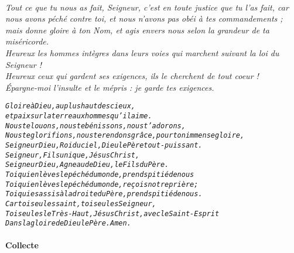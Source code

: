 \documentclass[twoside]{article}
\begin{document}

\\
\emph{\rr Tout ce que tu nous as fait, Seigneur, c'est en toute justice que tu l'as fait, car nous avons péché contre toi, et nous n'avons pas obéi à tes commandements ; mais donne gloire à ton Nom, et agis envers nous selon la grandeur de ta miséricorde.\\
\vv {} Heureux les hommes intègres dans leurs voies qui marchent suivant la loi du Seigneur !\\
\vv {} Heureux ceux qui gardent ses exigences, ils le cherchent de tout coeur !\\
\vv {} Épargne-moi l'insulte et le mépris : je garde tes exigences.}



\begin{alltt}\normalfont
\emph{Gloire à Dieu, au plus haut des cieux, 
et paix sur la terre aux hommes qu’il aime.
Nous te louons, nous te bénissons, nous t’adorons,
Nous te glorifions, nous te rendons grâce, pour ton immense gloire,
Seigneur Dieu, Roi du ciel, Dieu le Père tout-puissant.
Seigneur, Fils unique, Jésus Christ,
Seigneur Dieu, Agneau de Dieu, le Fils du Père.
Toi qui enlèves le péché du monde, prends pitié de nous
Toi qui enlèves le péché du monde, reçois notre prière ;
Toi qui es assis à la droite du Père, prends pitié de nous.
Car toi seul es saint, toi seul es Seigneur,
Toi seul es le Très-Haut, Jésus Christ, avec le Saint-Esprit
Dans la gloire de Dieu le Père. Amen.}
\end{alltt}

\paragraph{Collecte}
\end{document}
